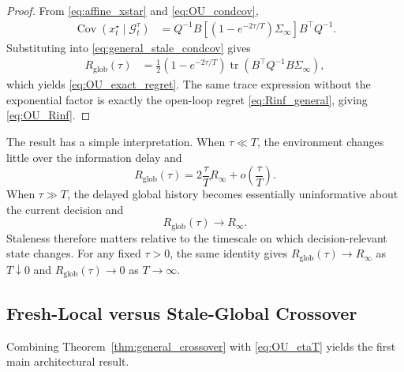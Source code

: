 \documentclass[11pt]{article}
\begin{document}
\begin{proof}
From \eqref{eq:affine_xstar} and \eqref{eq:OU_condcov},
\begin{align}
    \operatorname{Cov}
    \left(
        x_t^\star
        \mid
        \mathcal{G}^{\tau}_t
    \right)
    &=
    Q^{-1}B
    \left[
        \left(
            1-e^{-2\tau/T}
        \right)
        \Sigma_\infty
    \right]
    B^\top Q^{-1}.
    \label{eq:xstar_condcov}
\end{align}
Substituting into \eqref{eq:general_stale_condcov} gives
\begin{align}
    R_{\mathrm{glob}}(\tau)
    &=
    \frac{1}{2}
    \left(
        1-e^{-2\tau/T}
    \right)
    \operatorname{tr}
    \left(
        B^\top Q^{-1}B\Sigma_\infty
    \right),
\end{align}
which yields \eqref{eq:OU_exact_regret}. The same trace expression without
the exponential factor is exactly the open-loop regret
\eqref{eq:Rinf_general}, giving \eqref{eq:OU_Rinf}.
\end{proof}

The result has a simple interpretation. When $\tau\ll T$, the environment
changes little over the information delay and
\begin{equation}
    R_{\mathrm{glob}}(\tau)
    =
    2\frac{\tau}{T}R_\infty
    +
    o\!\left(\frac{\tau}{T}\right).
    \label{eq:small_rho}
\end{equation}
When $\tau\gg T$, the delayed global history becomes essentially uninformative about
the current decision and
\[
    R_{\mathrm{glob}}(\tau)
    \rightarrow
    R_\infty.
\]
Staleness therefore matters relative to the timescale on which
decision-relevant state changes.
For any fixed $\tau>0$, the same identity gives
$R_{\mathrm{glob}}(\tau)\to R_\infty$ as $T\downarrow0$ and
$R_{\mathrm{glob}}(\tau)\to0$ as $T\to\infty$.

\subsection{Fresh-Local versus Stale-Global Crossover}
\label{subsec:OU_crossover}

Combining Theorem~\ref{thm:general_crossover} with
\eqref{eq:OU_etaT} yields the first main architectural result.
\end{document}
